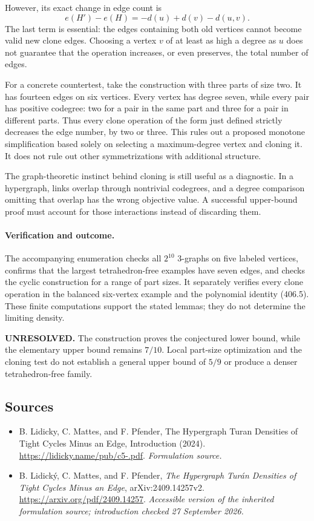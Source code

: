 \documentclass[11pt]{article}
\begin{document}
However, its exact change in edge count is
\[
 e(H')-e(H)=-d(u)+d(v)-d(u,v). \tag{406.7}
\]
The last term is essential: the edges containing both old vertices cannot become valid new clone edges. Choosing a vertex $v$ of at least as high a degree as $u$ does not guarantee that the operation increases, or even preserves, the total number of edges.

For a concrete countertest, take the construction with three parts of size two. It has fourteen edges on six vertices. Every vertex has degree seven, while every pair has positive codegree: two for a pair in the same part and three for a pair in different parts. Thus every clone operation of the form just defined strictly decreases the edge number, by two or three. This rules out a proposed monotone simplification based solely on selecting a maximum-degree vertex and cloning it. It does not rule out other symmetrizations with additional structure.

The graph-theoretic instinct behind cloning is still useful as a diagnostic. In a hypergraph, links overlap through nontrivial codegrees, and a degree comparison omitting that overlap has the wrong objective value. A successful upper-bound proof must account for those interactions instead of discarding them.

\paragraph{Verification and outcome.}
The accompanying enumeration checks all $2^{10}$ 3-graphs on five labeled vertices, confirms that the largest tetrahedron-free examples have seven edges, and checks the cyclic construction for a range of part sizes. It separately verifies every clone operation in the balanced six-vertex example and the polynomial identity (406.5). These finite computations support the stated lemmas; they do not determine the limiting density.

\textbf{UNRESOLVED.} The construction proves the conjectured lower bound, while the elementary upper bound remains $7/10$. Local part-size optimization and the cloning test do not establish a general upper bound of $5/9$ or produce a denser tetrahedron-free family.

\subsection{Sources}
\begin{itemize}
\item[S1]B. Lidicky, C. Mattes, and F. Pfender, The Hypergraph Turan Densities of Tight Cycles Minus an Edge, Introduction (2024).
\url{https://lidicky.name/pub/c5-.pdf}.
\textit{Formulation source.}
\item[E1]B. Lidick\'y, C. Mattes, and F. Pfender, \emph{The Hypergraph Tur\'an Densities of Tight Cycles Minus an Edge}, arXiv:2409.14257v2.
\url{https://arxiv.org/pdf/2409.14257}.
\textit{Accessible version of the inherited formulation source; introduction checked 27 September 2026.}
\end{itemize}
\end{document}
